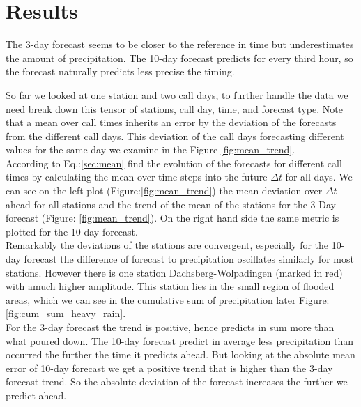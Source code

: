 \documentclass{article}
\theoremstyle{plain}
\theoremstyle{definition}
\theoremstyle{remark}
\begin{document}
\section{Results}\label{sec:results}


The 3-day forecast seems to be closer to the reference in time but underestimates the amount of precipitation.
The 10-day forecast predicts for every third hour, so the forecast naturally predicts less precise the timing.  

So far we looked at one station and two call days, to further handle the data we need break down this tensor of stations, call day, time, and forecast type. Note that a mean over call times inherits an error by the deviation of the forecasts from the different call days. This deviation of the call days forecasting different values for the same day we examine in the Figure \ref{fig:mean_trend}. \\
%  

According to Eq.:\ref{sec:mean} find the evolution of the forecasts for different call times by calculating the mean over time steps into the future $\Delta t$ for all days. We can see on the left plot (Figure:\ref{fig:mean_trend}) the mean deviation over $\Delta t$ ahead for all stations and the trend of the mean of the stations for the 3-Day forecast  (Figure: \ref{fig:mean_trend}). On the right hand side the same metric is plotted for the 10-day forecast. \\
Remarkably the deviations of the stations are convergent, especially for the 10-day forecast the difference of forecast to precipitation oscillates similarly for most stations. However there is one station Dachsberg-Wolpadingen (marked in red) with amuch higher amplitude. This station lies in the small region of flooded areas, which we can see in the cumulative sum of precipitation later Figure:\ref{fig:cum_sum_heavy_rain}. \\

For the 3-day forecast the trend is positive, hence predicts in sum more than what poured down. The 10-day forecast predict in average less precipitation than occurred the further the time it predicts ahead. But looking at the absolute mean error of 10-day forecast we get a positive trend that is higher than the 3-day forecast trend. So the absolute deviation of the forecast increases the further we predict ahead.\\
\end{document}
